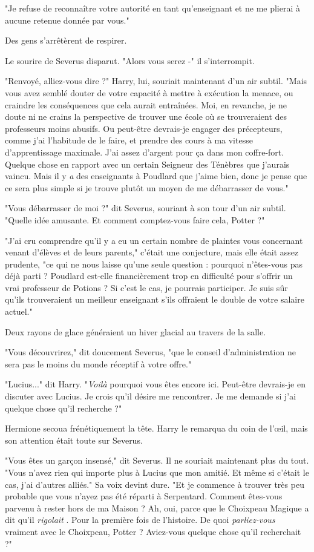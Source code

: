 "Je refuse de reconnaître votre autorité en tant qu'enseignant et ne me plierai à aucune retenue donnée par vous."

Des gens s'arrêtèrent de respirer.

Le sourire de Severus disparut. "Alors vous serez -" il s'interrompit.

"Renvoyé, alliez-vous dire ?" Harry, lui, souriait maintenant d'un air subtil. "Mais vous avez semblé douter de votre capacité à mettre à exécution la menace, ou craindre les conséquences que cela aurait entraînées. Moi, en revanche, je ne doute ni ne crains la perspective de trouver une école où se trouveraient des professeurs moins abusifs. Ou peut-être devrais-je engager des précepteurs, comme j'ai l'habitude de le faire, et prendre des cours à ma vitesse d'apprentissage maximale. J'ai assez d'argent pour ça dans mon coffre-fort. Quelque chose en rapport avec un certain Seigneur des Ténèbres que j'aurais vaincu. Mais il y \emph{a}  des enseignants à Poudlard que j'aime bien, donc je pense que ce sera plus simple si je trouve plutôt un moyen de me débarrasser de vous."

"Vous débarrasser de moi ?" dit Severus, souriant à son tour d'un air subtil. "Quelle idée amusante. Et comment comptez-vous faire cela, Potter ?"

"J'ai cru comprendre qu'il y a eu un certain nombre de plaintes vous concernant venant d'élèves et de leurs parents," c'était une conjecture, mais elle était assez prudente, "ce qui ne nous laisse qu'une seule question : pourquoi n'êtes-vous pas déjà parti ? Poudlard est-elle financièrement trop en difficulté pour s'offrir un vrai professeur de Potions ? Si c'est le cas, je pourrais participer. Je suis sûr qu'ils trouveraient un meilleur enseignant s'ils offraient le double de votre salaire actuel."

Deux rayons de glace généraient un hiver glacial au travers de la salle.

"Vous découvrirez," dit doucement Severus, "que le conseil d'administration ne sera pas le moins du monde réceptif à votre offre."

"Lucius..." dit Harry. "\emph{Voilà}  pourquoi vous êtes encore ici. Peut-être devrais-je en discuter avec Lucius. Je crois qu'il désire me rencontrer. Je me demande si j'ai quelque chose qu'il recherche ?"

Hermione secoua frénétiquement la tête. Harry le remarqua du coin de l'œil, mais son attention était toute sur Severus.

"Vous êtes un garçon insensé," dit Severus. Il ne souriait maintenant plus du tout. "Vous n'avez rien qui importe plus à Lucius que mon amitié. Et même si c'était le cas, j'ai d'autres alliés." Sa voix devint dure. "Et je commence à trouver très peu probable que vous n'ayez pas été réparti à Serpentard. Comment êtes-vous parvenu à rester hors de ma Maison ? Ah, oui, parce que le Choixpeau Magique a dit qu'il \emph{rigolait} . Pour la première fois de l'histoire. De quoi \emph{parliez-vous}  vraiment avec le Choixpeau, Potter ? Aviez-vous quelque chose qu'il recherchait ?"


